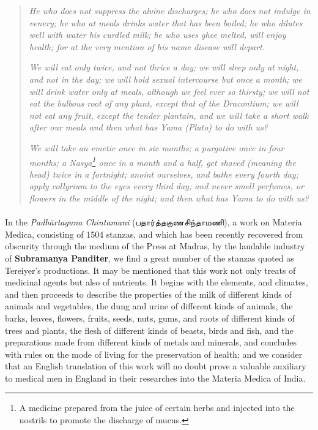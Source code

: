 \documentclass{article}
\newcommand{\TamilText}[1]{\texttamil{#1}}
\newcommand{\tam}[1]{\TamilText{#1}}
\begin{document}
\begin{quotation}\small
\emph{He who does not suppress the alvine discharges; he who does not indulge in venery; he who at meals drinks water that has been boiled; he who dilutes well with water his curdled milk; he who uses ghee melted, will enjoy health; for at the very mention of his name disease will depart.}

\emph{We will eat only twice, and not thrice a day; we will sleep only at night, and not in the day; we will hold sexual intercourse but once a month; we will drink water only at meals, although we feel ever so thirsty; we will not eat the bulbous root of any plant, except that of the Dracontium; we will not eat any fruit, except the tender plantain, and we will take a short walk after our meals and then what has Yama (Pluto) to do with us?}

\emph{We will take an emetic once in six months; a purgative once in four months; a Nasya\footnote{A medicine prepared from the juice of certain herbs and injected into the nostrils to promote the discharge of mucus.} once in a month and a half, get shaved (meaning the head) twice in a fortnight; anoint ourselves, and bathe every fourth day; apply collyrium to the eyes every third day; and never smell perfumes, or flowers in the middle of the night; and then what has Yama to do with us?}
\end{quotation}
\paragraph{}
In the \emph{Padh\={a}rtaguna Chintamani} (\tam{பதார்த்தகுணசிந்தாமணி}), a work on Materia Medica, consisting of 1504 stanzas, and which has been recently recovered from obscurity through the medium of the Press at Madras, by the laudable industry of \textbf{Subramanya Panditer}, we find a great number of the stanzas quoted as Tereiyer's productions. It may be mentioned that this work not only treats of medicinal agents but also of nutrients. It begins with the elements, and climates, and then proceeds to describe the properties of the milk of different kinds of animals and vegetables, the dung and urine of different kinds of animals, the barks, leaves, flowers, fruits, seeds, nuts, gums, and roots of different kinds of trees and plants, the flesh of different kinds of beasts, birds and fish, and the preparations made from different kinds of metals and minerals, and concludes with rules on the mode of living for the preservation of health; and we consider that an English translation of this work will no doubt prove a valuable auxiliary to medical men in England in their researches into the Materia Medica of India.
\end{document}
